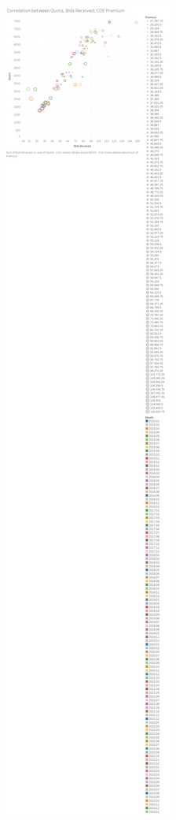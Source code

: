 \documentclass[a4paper, 11pt]{article}
\begin{document}
\begin{center}
\includegraphics[width=.9\linewidth]{./charts/quota-bids-premium.png}
\end{center}
\end{document}
